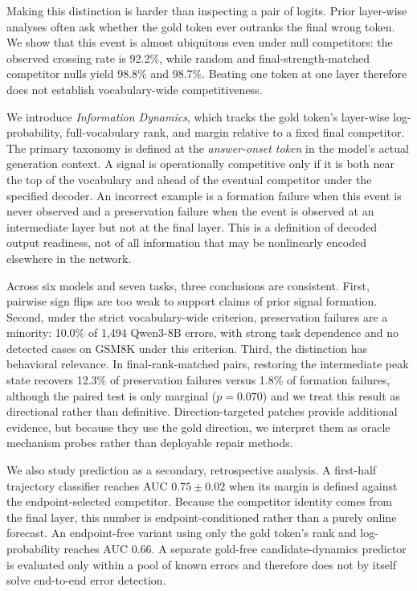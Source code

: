 \documentclass{article} %
\begin{document}
Making this distinction is harder than inspecting a pair of logits. Prior layer-wise analyses often ask whether the gold token ever outranks the final wrong token. We show that this event is almost ubiquitous even under null competitors: the observed crossing rate is 92.2\%, while random and final-strength-matched competitor nulls yield 98.8\% and 98.7\%. Beating one token at one layer therefore does not establish vocabulary-wide competitiveness.

We introduce \emph{Information Dynamics}, which tracks the gold token's layer-wise log-probability, full-vocabulary rank, and margin relative to a fixed final competitor. The primary taxonomy is defined at the \emph{answer-onset token} in the model's actual generation context. A signal is operationally competitive only if it is both near the top of the vocabulary and ahead of the eventual competitor under the specified decoder. An incorrect example is a formation failure when this event is never observed and a preservation failure when the event is observed at an intermediate layer but not at the final layer. This is a definition of decoded output readiness, not of all information that may be nonlinearly encoded elsewhere in the network.

Across six models and seven tasks, three conclusions are consistent. First, pairwise sign flips are too weak to support claims of prior signal formation. Second, under the strict vocabulary-wide criterion, preservation failures are a minority: 10.0\% of 1{,}494 Qwen3-8B errors, with strong task dependence and no detected cases on GSM8K under this criterion. Third, the distinction has behavioral relevance. In final-rank-matched pairs, restoring the intermediate peak state recovers 12.3\% of preservation failures versus 1.8\% of formation failures, although the paired test is only marginal ($p=0.070$) and we treat this result as directional rather than definitive. Direction-targeted patches provide additional evidence, but because they use the gold direction, we interpret them as oracle mechanism probes rather than deployable repair methods.

We also study prediction as a secondary, retrospective analysis. A first-half trajectory classifier reaches AUC $0.75\pm0.02$ when its margin is defined against the endpoint-selected competitor. Because the competitor identity comes from the final layer, this number is endpoint-conditioned rather than a purely online forecast. An endpoint-free variant using only the gold token's rank and log-probability reaches AUC 0.66. A separate gold-free candidate-dynamics predictor is evaluated only within a pool of known errors and therefore does not by itself solve end-to-end error detection.
\end{document}
